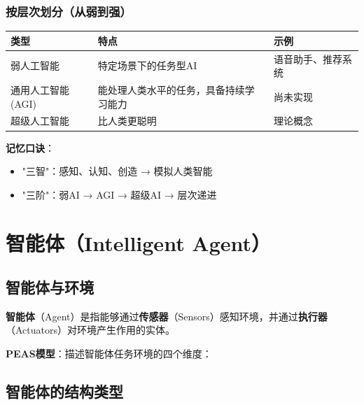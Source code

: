 \subsubsection{按层次划分（从弱到强）}
\begin{table}[htbp]
\centering\small
\begin{tabular}{lll}
\toprule
\textbf{类型} & \textbf{特点} & \textbf{示例} \\
\midrule
弱人工智能 & 特定场景下的任务型AI & 语音助手、推荐系统 \\
通用人工智能(AGI) & 能处理人类水平的任务，具备持续学习能力 & 尚未实现 \\
超级人工智能 & 比人类更聪明 & 理论概念 \\
\bottomrule
\end{tabular}
\end{table}

\begin{tipbox}
\textbf{记忆口诀}：
\begin{itemize}[itemsep=0pt]
    \item "三智"：感知、认知、创造 → 模拟人类智能
    \item "三阶"：弱AI → AGI → 超级AI → 层次递进
\end{itemize}
\end{tipbox}


\section{智能体（Intelligent Agent）}

\subsection{智能体与环境}

\begin{conceptbox}
\textbf{智能体}（Agent）是指能够通过\textbf{传感器}（Sensors）感知环境，并通过\textbf{执行器}（Actuators）对环境产生作用的实体。
\end{conceptbox}

\textbf{PEAS模型}：描述智能体任务环境的四个维度：

\subsection{智能体的结构类型}

